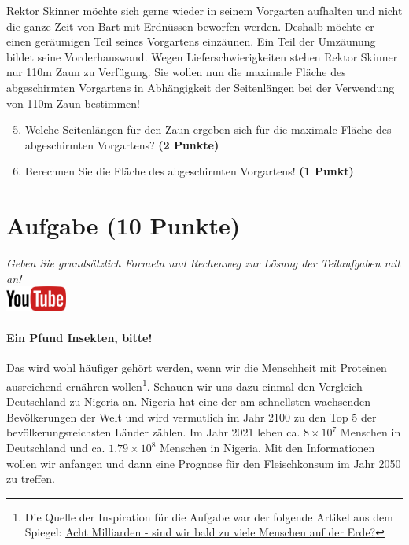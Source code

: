 \documentclass[a4paper, 9pt]{scrartcl}\usepackage[]{graphicx}\usepackage[]{xcolor}
\begin{document}
Rektor Skinner m{\"o}chte sich gerne wieder in seinem Vorgarten aufhalten und
nicht die ganze Zeit von Bart mit Erdn{\"u}ssen beworfen werden. Deshalb m{\"o}chte
er einen ger{\"a}umigen Teil seines Vorgartens einz{\"a}unen. Ein Teil der
Umz{\"a}unung bildet seine Vorderhauswand. Wegen Lieferschwierigkeiten stehen
Rektor Skinner nur 110m Zaun zu Verf{\"u}gung. Sie wollen nun die
maximale Fl{\"a}che des abgeschirmten Vorgartens in Abh{\"a}ngigkeit der
Seitenl{\"a}ngen bei der Verwendung von 110m Zaun bestimmen!

\begin{enumerate}
  \setcounter{enumi}{4}  
\item  Welche Seitenl{\"a}ngen f{\"u}r den Zaun ergeben sich f{\"u}r die
  maximale Fl{\"a}che des abgeschirmten Vorgartens? \textbf{(2 Punkte)}
\item Berechnen Sie die Fl{\"a}che des abgeschirmten Vorgartens! \textbf{(1
    Punkt)}
\end{enumerate}

 
\clearpage

\section{Aufgabe \hfill (10 Punkte)}

\textit{Geben Sie grunds{\"a}tzlich Formeln und Rechenweg zur L{\"o}sung der
  Teilaufgaben mit an!} \\[1Ex]

\hfill\href{https://youtu.be/OhyuH6hzEhY}{\includegraphics[width = 2cm]{img/youtube}} %
\hspace{2Ex}




\paragraph{Ein Pfund Insekten, bitte!} Das wird wohl h{\"a}ufiger geh{\"o}rt
werden, wenn wir die Menschheit mit Proteinen ausreichend ern{\"a}hren
wollen\footnote{Die Quelle der Inspiration f{\"u}r die Aufgabe war der folgende
  Artikel aus dem Spiegel:
  \href{https://www.spiegel.de/ausland/ueberbevoelkerung-acht-milliarden-sind-wir-bald-zu-viele-menschen-auf-der-erde-a-3f20c7bc-3d60-4440-9f52-eb338db207f5}{Acht
    Milliarden - sind wir bald zu viele Menschen auf der Erde?}}. Schauen
wir uns dazu einmal den Vergleich Deutschland zu Nigeria an. Nigeria hat
eine der am schnellsten wachsenden Bev{\"o}lkerungen der Welt und wird
vermutlich im Jahr 2100 zu den Top 5 der bev{\"o}lkerungsreichsten L{\"a}nder
z{\"a}hlen. Im Jahr 2021 leben ca. \ensuremath{8\times 10^{7}} Menschen in
Deutschland und ca. \ensuremath{1.79\times 10^{8}} Menschen in Nigeria. Mit den
Informationen wollen wir anfangen und dann eine Prognose f{\"u}r den
Fleischkonsum im Jahr 2050 zu treffen. \\ 
\end{document}

